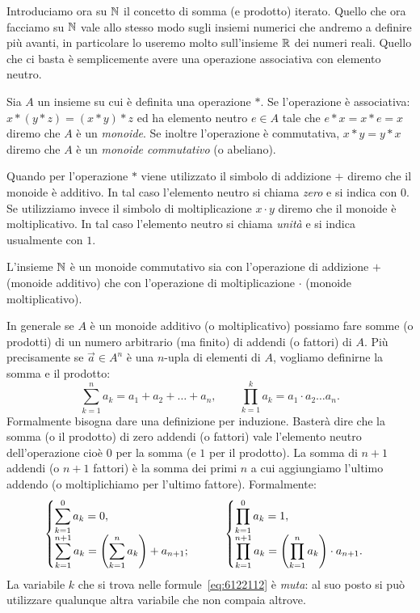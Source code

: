 Introduciamo ora su ${\mathbb N}$ il concetto di somma (e prodotto) iterato.
Quello che ora facciamo su ${\mathbb N}$ vale allo stesso modo sugli insiemi 
numerici che andremo a definire più avanti, in particolare lo useremo 
molto sull'insieme ${\mathbb R}$ dei numeri reali. 
Quello che ci basta è semplicemente avere una operazione associativa 
con elemento neutro. 

\begin{definition}[monoide]%
\label{def:monoide}%
Sia $A$ un insieme su cui è definita una operazione $*$.
Se l'operazione è associativa: $x*(y*z) = (x*y)*z$ 
ed ha elemento neutro $e\in A$ tale che $e*x = x*e = x$
diremo che $A$ è un \emph{monoide}.
Se inoltre l'operazione è commutativa, $x*y=y*x$ 
diremo che $A$ è un \emph{monoide commutativo} (o abeliano).

Quando per l'operazione $*$ viene utilizzato il simbolo di addizione $+$
diremo che il monoide è additivo. In tal caso l'elemento neutro 
si chiama \emph{zero} e si indica con $0$.
Se utilizziamo invece il simbolo di moltiplicazione $x\cdot y$
diremo che il monoide è moltiplicativo. In tal caso l'elemento 
neutro si chiama \emph{unità} e si indica usualmente con $1$.
\end{definition}

L'insieme ${\mathbb N}$ è un monoide commutativo sia con l'operazione di addizione $+$ 
(monoide additivo) che con l'operazione di moltiplicazione 
$\cdot$ (monoide moltiplicativo).

In generale se $A$ è un monoide additivo 
(o moltiplicativo) possiamo fare somme (o prodotti) di un numero 
arbitrario (ma finito) di addendi (o fattori) di $A$.
Più precisamente se $\vec a \in A^n$ 
è una $n$-upla di elementi di $A$, 
vogliamo definirne la somma e il prodotto:
\begin{equation}\label{eq:6122112}
\sum_{k=1}^n a_k = a_1 + a_2 + \dots + a_n,
\qquad 
\prod_{k=1}^k a_k = a_1 \cdot a_2 \dots a_n.
\end{equation}
Formalmente bisogna dare una definizione per induzione. 
Basterà dire che la somma (o il prodotto)
di zero addendi (o fattori) vale l'elemento neutro 
dell'operazione cioè $0$ per la somma (e $1$ per il prodotto).
La somma di $n+1$ addendi (o $n+1$ fattori) è la somma dei primi $n$ 
a cui aggiungiamo l'ultimo addendo (o moltiplichiamo per l'ultimo fattore).
Formalmente:
\[
  \begin{cases}
    \displaystyle\sum_{k=1}^{0} a_k = 0, \\
    \displaystyle\sum_{k=1}^{n+1} a_k = {\left( \sum_{k=1}^{n} a_k \right)} + a_{n+1};
  \end{cases}  \qquad
  \begin{cases}
    \displaystyle\prod_{k=1}^{0} a_k = 1, \\
    \displaystyle\prod_{k=1}^{n+1} a_k = {\left( \prod_{k=1}^{n} a_k \right)} \cdot a_{n+1}.
  \end{cases}
\]
La variabile $k$ che si trova nelle formule~\eqref{eq:6122112} è \emph{muta}: 
al suo posto si può utilizzare qualunque altra variabile che non
compaia altrove.

